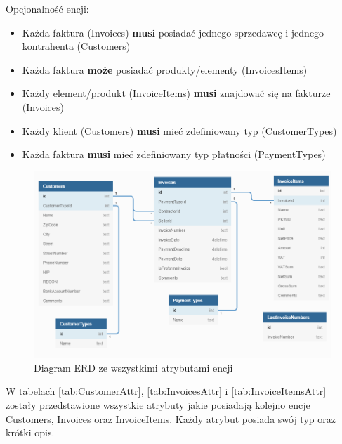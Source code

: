 Opcjonalność encji:

\begin{itemize}
    \item Każda faktura (Invoices) \textbf{musi} posiadać jednego sprzedawcę i jednego kontrahenta (Customers)
    \item Każda faktura \textbf{może} posiadać produkty/elementy (InvoicesItems)
    \item Każdy element/produkt (InvoiceItems) \textbf{musi} znajdować się na fakturze (Invoices)
    \item Każdy klient (Customers) \textbf{musi} mieć zdefiniowany typ
    (CustomerTypes)
    \item Każda faktura \textbf{musi} mieć zdefiniowany typ płatności (PaymentTypes)
\end{itemize}

\begin{figure}[ht!]
  \includegraphics[width=\linewidth]{Rysunki/ERDAttr.png}
  \caption{Diagram ERD ze wszystkimi atrybutami encji}
  \label{fig:erdDiagramAttr}
\end{figure}

W tabelach \ref{tab:CustomerAttr}, \ref{tab:InvoicesAttr} i \ref{tab:InvoiceItemsAttr} zostały przedstawione wszystkie atrybuty jakie posiadają kolejno encje Customers, Invoices oraz InvoiceItems. Każdy atrybut posiada swój typ oraz krótki opis.

